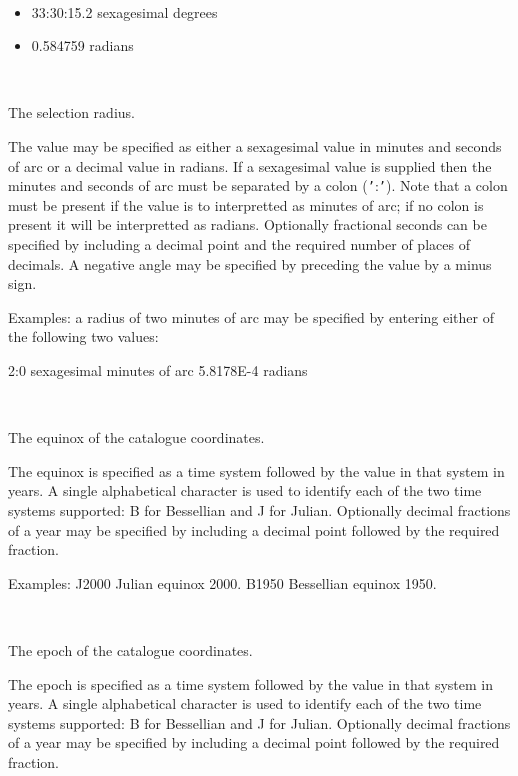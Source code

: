 \documentclass[twoside,11pt]{article}
\renewcommand{\_}{\texttt{\symbol{95}}}
\newcommand{\sstsubsection}[1]{ \item[{#1}] \mbox{} \\}
\newcommand{\sstitemlist}[1]{
  \mbox{} \\
  \vspace{-3.5ex}
  \begin{itemize}
     #1
  \end{itemize}
}
\newcommand{\sstitem}{\item}
\newcommand{\sstsubsection}[1]{\item[{#1}]}
\newcommand{\sstitemlist}[1]{
      \begin{itemize}
         #1
      \end{itemize}
      \\
   }
\newcommand{\sstitem}{\item}
\begin{document}
\begin{htmlonly}
{{{         \sstitemlist{

            \sstitem
               33:30:15.2     sexagesimal degrees

            \sstitem
               0.584759       radians
         }
      }
      \sstsubsection{
         RADIUS  =  CHARACTER (read)
      }{
         The selection radius.

         The value may be specified as either a sexagesimal value in
         minutes and seconds of arc or a decimal value in radians.  If
         a sexagesimal value is supplied then the minutes and seconds
         of arc must be separated by a colon ({\tt '}:{\tt '}).  Note that a colon
         must be present if the value is to interpretted as minutes of
         arc; if no colon is present it will be interpretted as radians.
         Optionally fractional seconds can be specified by including a
         decimal point and the required number of places of decimals.  A
         negative angle may be specified by preceding the value by a
         minus sign.

         Examples: a radius of two minutes of arc may be specified by
         entering either of the following two values:

             2:0            sexagesimal minutes of arc
             5.8178E-4      radians
      }
      \sstsubsection{
         EQUINX  =  CHARACTER (read)
      }{
         The equinox of the catalogue coordinates.

         The equinox is specified as a time system followed by the
         value in that system in years.  A single alphabetical character
         is used to identify each of the two time systems supported:
         B for Bessellian and J for Julian.  Optionally decimal
         fractions of a year may be specified by including a decimal
         point followed by the required fraction.

         Examples:
             J2000          Julian equinox 2000.
             B1950          Bessellian equinox 1950.
      }
      \sstsubsection{
         EPOCH  =  CHARACTER (read)
      }{
         The epoch of the catalogue coordinates.

         The epoch is specified as a time system followed by the
         value in that system in years.  A single alphabetical character
         is used to identify each of the two time systems supported:
         B for Bessellian and J for Julian.  Optionally decimal
         fractions of a year may be specified by including a decimal
         point followed by the required fraction.

}}}
\end{htmlonly}
\end{document}
